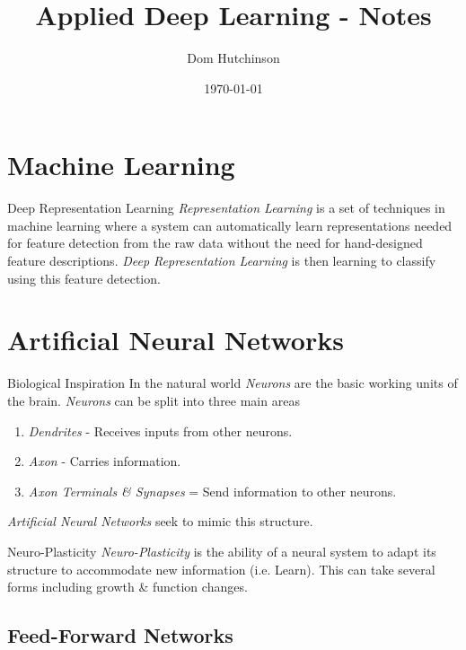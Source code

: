 \documentclass[11pt,a4paper]{article}
\begin{document}
\title{Applied Deep Learning - Notes}
\author{Dom Hutchinson}
\date{\today}
\maketitle

\tableofcontents\newpage

\section{Machine Learning}

\begin{definition}{Deep Representation Learning}
  \textit{Representation Learning} is a set of techniques in machine learning where a system can automatically learn representations needed for feature detection from the raw data without the need for hand-designed feature descriptions. \textit{Deep Representation Learning} is then learning to classify using this feature detection.
\end{definition}

\section{Artificial Neural Networks}

\begin{remark}{Biological Inspiration}
  In the natural world \textit{Neurons} are the basic working units of the brain. \textit{Neurons} can be split into three main areas
  \begin{enumerate}
    \item \textit{Dendrites} - Receives inputs from other neurons.
    \item \textit{Axon} - Carries information.
    \item \textit{Axon Terminals \& Synapses} = Send information to other neurons.
  \end{enumerate}
  \textit{Artificial Neural Networks} seek to mimic this structure.
\end{remark}

\begin{definition}{Neuro-Plasticity}
  \textit{Neuro-Plasticity} is the ability of a neural system to adapt its structure to accommodate new information (i.e. Learn). This can take several forms including growth \& function changes.
\end{definition}

\subsection{Feed-Forward Networks}
\end{document}

